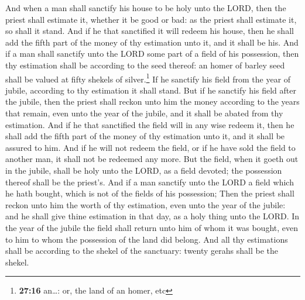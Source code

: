  And when a man shall sanctify his house to be holy unto
the LORD, then the priest shall estimate it, whether it be good or bad:
as the priest shall estimate it, so shall it stand.  And
if he that sanctified it will redeem his house, then he shall add the
fifth part of the money of thy estimation unto it, and it shall be his.
 And if a man shall sanctify unto the LORD some part of a
field of his possession, then thy estimation shall be according to the
seed thereof: an homer of barley seed shall be valued at fifty shekels
of silver.\footnote{\textbf{27:16} an\ldots: or, the land of an homer,
  etc}  If he sanctify his field from the year of jubile,
according to thy estimation it shall stand.  But if he
sanctify his field after the jubile, then the priest shall reckon unto
him the money according to the years that remain, even unto the year of
the jubile, and it shall be abated from thy estimation. 
And if he that sanctified the field will in any wise redeem it, then he
shall add the fifth part of the money of thy estimation unto it, and it
shall be assured to him.  And if he will not redeem the
field, or if he have sold the field to another man, it shall not be
redeemed any more.  But the field, when it goeth out in
the jubile, shall be holy unto the LORD, as a field devoted; the
possession thereof shall be the priest's.  And if a man
sanctify unto the LORD a field which he hath bought, which is not of the
fields of his possession;  Then the priest shall reckon
unto him the worth of thy estimation, even unto the year of the jubile:
and he shall give thine estimation in that day, as a holy thing unto the
LORD.  In the year of the jubile the field shall return
unto him of whom it was bought, even to him to whom the possession of
the land did belong.  And all thy estimations shall be
according to the shekel of the sanctuary: twenty gerahs shall be the
shekel.

